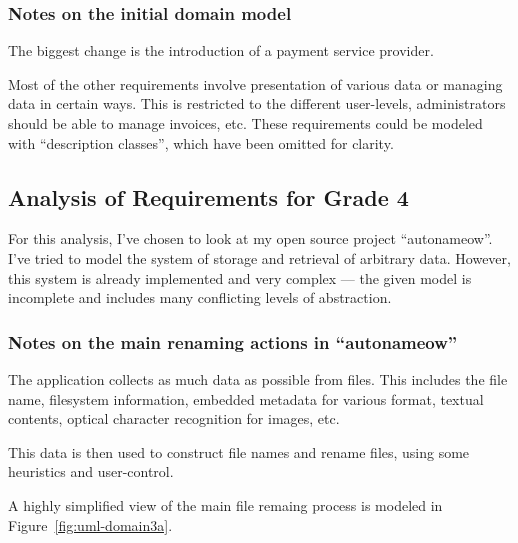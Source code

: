 \subsubsection{Notes on the initial domain model}
The biggest change is the introduction of a payment service provider.

Most of the other requirements involve presentation of various data or managing
data in certain ways.  This is restricted to the different user-levels,
administrators should be able to manage invoices, etc.  These requirements
could be modeled with ``description classes'', which have been omitted for
clarity.


\subsection{Analysis of Requirements for Grade 4}
For this analysis, I've chosen to look at my open source project
``autonameow''\cite{js:autonameow-github}.  I've tried to model the system of
storage and retrieval of arbitrary data. However, this system is already
implemented and very complex --- the given model is incomplete and includes
many conflicting levels of abstraction.


\subsubsection{Notes on the main renaming actions in ``autonameow''}
The application collects as much data as possible from files. This includes the
file name, filesystem information, embedded metadata for various format,
textual contents, optical character recognition for images, etc. 

This data is then used to construct file names and rename files, using some
heuristics and user-control.

A highly simplified view of the main file remaing process is modeled in
Figure~\ref{fig:uml-domain3a}.


